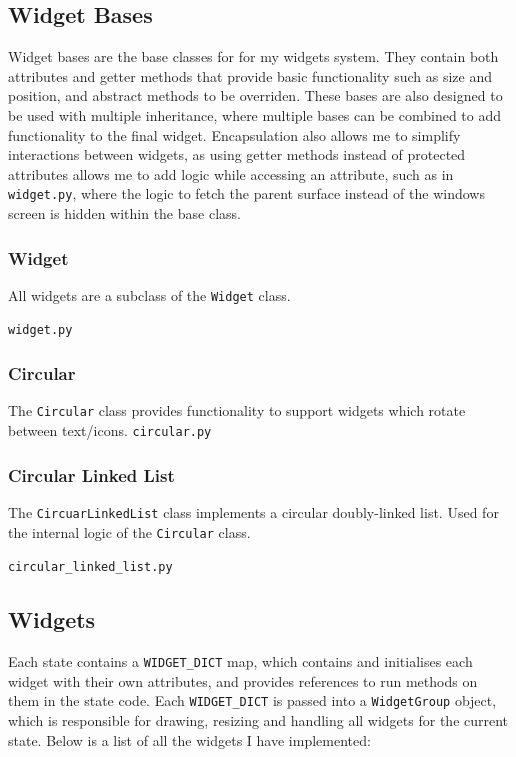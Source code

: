 \documentclass[../main/main.tex]{subfiles}
\begin{document}
\subsection{Widget Bases}
\label{sec:widget-bases}
Widget bases are the base classes for for my widgets system. They contain both attributes and getter methods that provide basic functionality such as size and position, and abstract methods to be overriden. These bases are also designed to be used with multiple inheritance, where multiple bases can be combined to add functionality to the final widget. Encapsulation also allows me to simplify interactions between widgets, as using getter methods instead of protected attributes allows me to add logic while accessing an attribute, such as in \verb|widget.py|, where the logic to fetch the parent surface instead of the windows screen is hidden within the base class.

\subsubsection*{Widget}
\noindent All widgets are a subclass of the \lstinline{Widget} class.

\noindent\verb|widget.py|


\subsubsection*{Circular}
\noindent The \lstinline{Circular} class provides functionality to support widgets which rotate between text/icons.
\noindent\verb|circular.py|


\subsubsection*{Circular Linked List}
\label{sec:linked-list}
The \lstinline{CircuarLinkedList} class implements a circular doubly-linked list. Used for the internal logic of the \lstinline{Circular} class.

\noindent\verb|circular_linked_list.py|


\subsection{Widgets}
\label{sec:widgets}
Each state contains a \lstinline{WIDGET_DICT} map, which contains and initialises each widget with their own attributes, and provides references to run methods on them in the state code. Each \lstinline{WIDGET_DICT} is passed into a \lstinline{WidgetGroup} object, which is responsible for drawing, resizing and handling all widgets for the current state.
Below is a list of all the widgets I have implemented:
\end{document}
